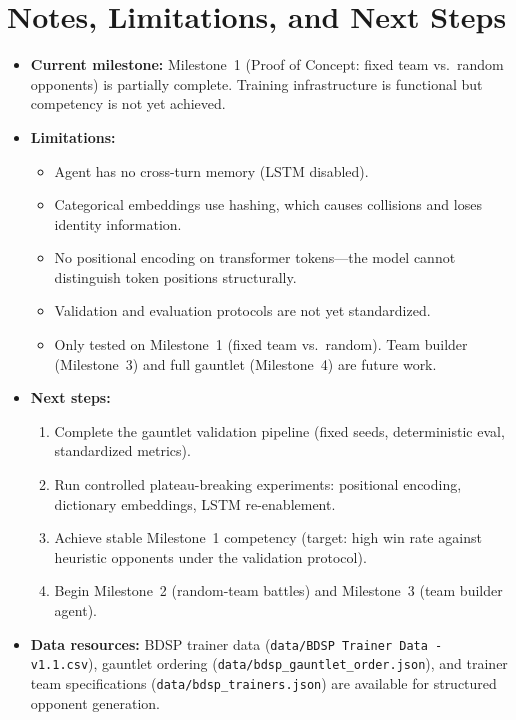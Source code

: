 \documentclass[11pt, a4paper]{article}
\begin{document}
\section{Notes, Limitations, and Next Steps}
\begin{itemize}
    \item \textbf{Current milestone:}
        Milestone~1 (Proof of Concept: fixed team vs.\ random opponents) is partially complete. Training infrastructure is functional but competency is not yet achieved.

    \item \textbf{Limitations:}
        \begin{itemize}
            \item Agent has no cross-turn memory (LSTM disabled).
            \item Categorical embeddings use hashing, which causes collisions and loses identity information.
            \item No positional encoding on transformer tokens---the model cannot distinguish token positions structurally.
            \item Validation and evaluation protocols are not yet standardized.
            \item Only tested on Milestone~1 (fixed team vs.\ random). Team builder (Milestone~3) and full gauntlet (Milestone~4) are future work.
        \end{itemize}

    \item \textbf{Next steps:}
        \begin{enumerate}
            \item Complete the gauntlet validation pipeline (fixed seeds, deterministic eval, standardized metrics).
            \item Run controlled plateau-breaking experiments: positional encoding, dictionary embeddings, LSTM re-enablement.
            \item Achieve stable Milestone~1 competency (target: high win rate against heuristic opponents under the validation protocol).
            \item Begin Milestone~2 (random-team battles) and Milestone~3 (team builder agent).
        \end{enumerate}

    \item \textbf{Data resources:}
        BDSP trainer data (\texttt{data/BDSP Trainer Data - v1.1.csv}), gauntlet ordering (\texttt{data/bdsp\_gauntlet\_order.json}), and trainer team specifications (\texttt{data/bdsp\_trainers.json}) are available for structured opponent generation.
\end{itemize}
\end{document}
